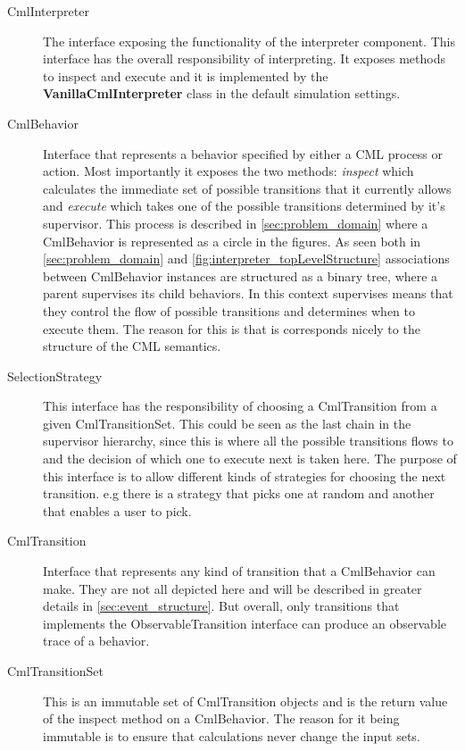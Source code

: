 \documentclass[a4paper, 10pt]{include/compassreport}   %
\begin{document}
\begin{description}
\item[CmlInterpreter] The interface exposing the functionality of the
  interpreter component. This interface has the overall responsibility
  of interpreting. It exposes methods to inspect and execute and it is
  implemented by the \textbf{VanillaCmlInterpreter} class in the default
  simulation settings.

\item[CmlBehavior] Interface that represents a behavior specified by
  either a CML process or action. Most importantly it exposes the two
  methods: \emph{inspect} which calculates the immediate set of possible
  transitions that it currently allows and \emph{execute} which takes
  one of the possible transitions determined by it's supervisor. This
  process is described in \autoref{sec:problem_domain} where a
  CmlBehavior is represented as a circle in the figures. As seen both in
  \autoref{sec:problem_domain} and
  \autoref{fig:interpreter_topLevelStructure} associations between
  CmlBehavior instances are structured as a binary tree, where a parent
  supervises its child behaviors. In this context supervises means that
  they control the flow of possible transitions and determines when to
  execute them. The reason for this is that is corresponds nicely to
  the structure of the CML semantics.

\item[SelectionStrategy] This interface has the responsibility of
  choosing a CmlTransition from a given CmlTransitionSet. This could be
  seen as the last chain in the supervisor hierarchy, since this is
  where all the possible transitions flows to and the decision of which
  one to execute next is taken here. The purpose of this interface is to
  allow different kinds of strategies for choosing the next
  transition. e.g there is a strategy that picks one at random 
  and another that enables a user to pick.

\item[CmlTransition] Interface that represents any kind of transition
  that a CmlBehavior can make. They are not all depicted here and will
  be described in greater details in \autoref{sec:event_structure}. But
  overall, only transitions that implements the ObservableTransition
  interface can produce an observable trace of a behavior.

\item[CmlTransitionSet] This is an immutable set of CmlTransition
  objects and is the return value of the inspect method on a
  CmlBehavior. The reason for it being immutable is to ensure that
  calculations never change the input sets.

\end{description}
\end{document}
